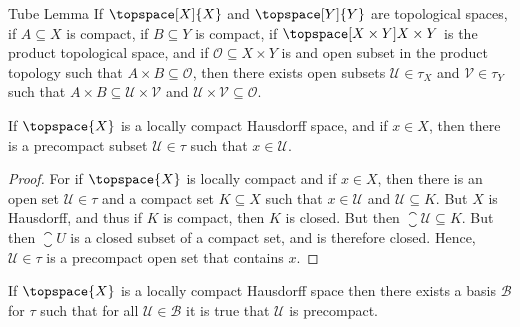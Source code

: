 \documentclass{article}                                                        %
\begin{document}
        \begin{ltheorem}{Tube Lemma}
            If $\topspace[X]{X}$ and $\topspace[Y]{Y}$ are topological spaces,
            if $A\subseteq{X}$ is compact, if $B\subseteq{Y}$ is compact,
            if $\topspace[X\times{Y}]{X\times{Y}}$ is the product topological
            space, and if $\mathscr{O}\subseteq{X}\times{Y}$ is and open subset
            in the product topology such that $A\times{B}\subseteq\mathscr{O}$,
            then there exists open subsets $\mathcal{U}\in\tau_{X}$ and
            $\mathcal{V}\in\tau_{Y}$ such that
            $A\times{B}\subseteq\mathcal{U}\times\mathcal{V}$ and
            $\mathcal{U}\times\mathcal{V}\subseteq\mathscr{O}$.
        \end{ltheorem}
        \begin{theorem}
            If $\topspace{X}$ is a locally compact Hausdorff space, and if
            $x\in{X}$, then there is a precompact subset $\mathcal{U}\in\tau$
            such that $x\in\mathcal{U}$.
        \end{theorem}
        \begin{proof}
            For if $\topspace{X}$ is locally compact and if $x\in{X}$, then
            there is an open set $\mathcal{U}\in\tau$ and a compact set
            $K\subseteq{X}$ such that $x\in\mathcal{U}$ and
            $\mathcal{U}\subseteq{K}$. But $X$ is Hausdorff, and thus if $K$ is
            compact, then $K$ is closed. But then
            $\closure{\mathcal{U}}\subseteq{K}$. But then $\closure{U}$ is a
            closed subset of a compact set, and is therefore closed. Hence,
            $\mathcal{U}\in\tau$ is a precompact open set that contains $x$.
        \end{proof}
        \begin{theorem}
            If $\topspace{X}$ is a locally compact Hausdorff space then there
            exists a basis $\mathcal{B}$ for $\tau$ such that for all
            $\mathcal{U}\in\mathcal{B}$ it is true that $\mathcal{U}$ is
            precompact.
        \end{theorem}
\end{document}
